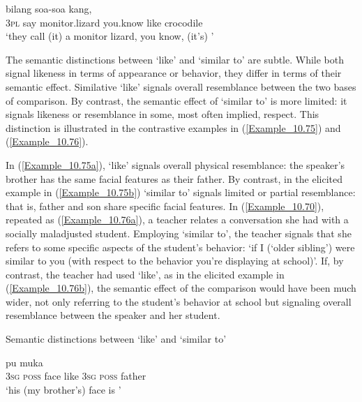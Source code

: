 \ea
\label{Example_10.74}
 {bilang} {soa-soa} {kang,} {} {}\\ %
 \textsc{3pl}  say  monitor.lizard  you.know  like  crocodile\\
\glt 
‘they call (it) a monitor lizard, you know, (it’s) ’ \textstyleExampleSource{[080922-009-CvNP.0053]}
\z


The semantic distinctions between  ‘like’ and  ‘similar to’ are subtle. While both signal likeness in terms of appearance or behavior, they differ in terms of their semantic effect. Similative  ‘like’ signals overall resemblance between the two bases of comparison. By contrast, the semantic effect of  ‘similar to’ is more limited: it signals likeness or resemblance in some, most often implied, respect. This distinction is illustrated in the contrastive examples in (\ref{Example_10.75}) and (\ref{Example_10.76}).



In (\ref{Example_10.75a}),  ‘like’ signals overall physical resemblance: the speaker’s brother has the same facial features as their father. By contrast, in the elicited example in (\ref{Example_10.75b})  ‘similar to’ signals limited or partial resemblance: that is, father and son share specific facial features. In (\ref{Example_10.70}), repeated as (\ref{Example_10.76a}), a teacher relates a conversation she had with a socially maladjusted student. Employing  ‘similar to’, the teacher signals that she refers to some specific aspects of the student’s behavior:  ‘if I (‘older sibling’) were similar to you (with respect to the behavior you’re displaying at school)’. If, by contrast, the teacher had used  ‘like’, as in the elicited example in (\ref{Example_10.76b}), the semantic effect of the comparison would have been much wider, not only referring to the student’s behavior at school but signaling overall resemblance between the speaker and her student.


\begin{styleExampleTitle}
Semantic distinctions between  ‘like’ and  ‘similar to’
\end{styleExampleTitle}

\ea
\label{Example_10.75}
\ea
\label{Example_10.75a}
 {pu} {muka} {} {} {} {}\\ %
   \textsc{3sg}  \textsc{poss}  face  like  \textsc{3sg}  \textsc{poss}  father\\
\glt ‘his (my brother’s) face is ’ \textstyleExampleSource{[080922-001a-CvPh.1445]}
\vspace{5pt}

